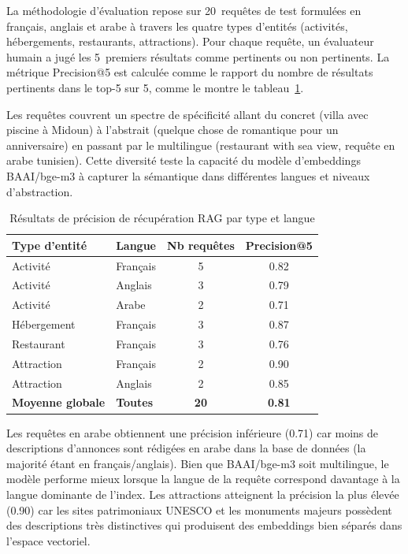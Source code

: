 La méthodologie d'évaluation repose sur 20~requêtes de test formulées en français, anglais
et arabe à travers les quatre types d'entités (activités, hébergements, restaurants,
attractions). Pour chaque requête, un évaluateur humain a jugé les 5~premiers résultats
comme pertinents ou non pertinents. La métrique Precision@5 est calculée comme le rapport
du nombre de résultats pertinents dans le top-5 sur 5, comme le montre le tableau~\ref{tab:rag_precision}.

Les requêtes couvrent un spectre de spécificité allant du concret (\og{}villa avec piscine
à Midoun\fg{}) à l'abstrait (\og{}quelque chose de romantique pour un anniversaire\fg{}) en
passant par le multilingue (\og{}restaurant with sea view\fg{},
requête en arabe tunisien). Cette diversité teste la capacité du modèle d'embeddings
BAAI/bge-m3 à capturer la sémantique dans différentes langues et niveaux d'abstraction.

\begin{table}[H]
    \centering
    \caption{Résultats de précision de récupération RAG par type et langue}
    \label{tab:rag_precision}
    \small
    \begin{tabular}{p{3cm} p{2cm} c c}
        \toprule
        \textbf{Type d'entité} & \textbf{Langue} & \textbf{Nb requêtes} &
        \textbf{Precision@5} \\
        \midrule
        Activité & Français & 5 & 0.82 \\
        Activité & Anglais & 3 & 0.79 \\
        Activité & Arabe & 2 & 0.71 \\
        Hébergement & Français & 3 & 0.87 \\
        Restaurant & Français & 3 & 0.76 \\
        Attraction & Français & 2 & 0.90 \\
        Attraction & Anglais & 2 & 0.85 \\
        \midrule
        \textbf{Moyenne globale} & \textbf{Toutes} & \textbf{20} & \textbf{0.81} \\
        \bottomrule
    \end{tabular}
\end{table}

Les requêtes en arabe obtiennent une précision inférieure (0.71) car moins de descriptions
d'annonces sont rédigées en arabe dans la base de données (la majorité étant en
français/anglais). Bien que BAAI/bge-m3 soit multilingue, le modèle performe mieux lorsque
la langue de la requête correspond davantage à la langue dominante de l'index. Les
attractions atteignent la précision la plus élevée (0.90) car les sites patrimoniaux
UNESCO et les monuments majeurs possèdent des descriptions très distinctives qui produisent
des embeddings bien séparés dans l'espace vectoriel.

